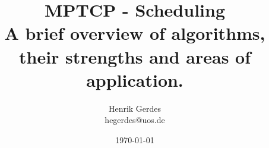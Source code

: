 

\title[MPTCP Scheduling]{MPTCP - Scheduling\\A brief overview of algorithms, their strengths and areas of application.}

\author[Henrik Gerdes]{Henrik Gerdes\\ {\scriptsize hegerdes@uos.de}}

\date{\today}